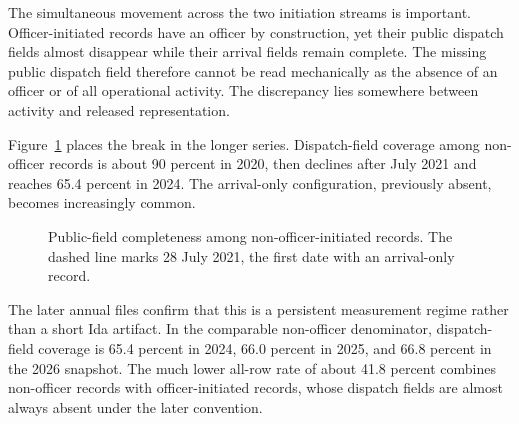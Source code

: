\documentclass[11pt]{article}
\begin{document}
The simultaneous movement across the two initiation streams is important. Officer-initiated records have an officer by construction, yet their public dispatch fields almost disappear while their arrival fields remain complete. The missing public dispatch field therefore cannot be read mechanically as the absence of an officer or of all operational activity. The discrepancy lies somewhere between activity and released representation.

Figure~\ref{fig:monthly} places the break in the longer series. Dispatch-field coverage among non-officer records is about 90 percent in 2020, then declines after July 2021 and reaches 65.4 percent in 2024. The arrival-only configuration, previously absent, becomes increasingly common.

\begin{figure}[t]
\centering
{}
\caption{Public-field completeness among non-officer-initiated records. The dashed line marks 28 July 2021, the first date with an arrival-only record.}
\label{fig:monthly}
\end{figure}

The later annual files confirm that this is a persistent measurement regime rather than a short Ida artifact. In the comparable non-officer denominator, dispatch-field coverage is 65.4 percent in 2024, 66.0 percent in 2025, and 66.8 percent in the 2026 snapshot. The much lower all-row rate of about 41.8 percent combines non-officer records with officer-initiated records, whose dispatch fields are almost always absent under the later convention.
\end{document}
